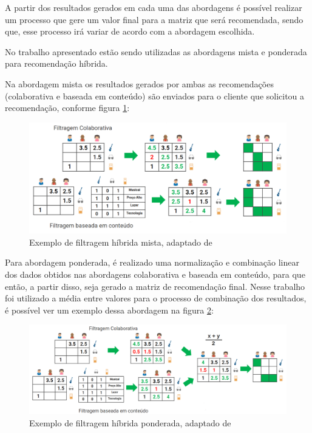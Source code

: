 A partir dos resultados gerados em cada uma das abordagens é possível realizar um processo que gere um valor final para a matriz que será recomendada, sendo que, esse processo irá variar de acordo com a abordagem escolhida. 

No trabalho apresentado estão sendo utilizadas as abordagens mista e ponderada para recomendação híbrida.

Na abordagem mista os resultados gerados por ambas as recomendações (colaborativa e baseada em conteúdo) são enviados para o cliente que solicitou a recomendação, conforme figura \ref{fig:algoritmohibridomisto}:

\begin{figure}[H]
	\centering
	\includegraphics[width=1\linewidth]{imagens/hibridamista.png}
	\caption[Exemplo de filtragem híbrida mista]{Exemplo de filtragem híbrida mista, adaptado de \cite{araujo2011apprecommender}}
    \label{fig:algoritmohibridomisto}
\end{figure}

Para abordagem ponderada, é realizado uma normalização e combinação linear dos dados obtidos nas abordagens colaborativa e baseada em conteúdo, para que então, a partir disso, seja gerado a matriz de recomendação final. Nesse trabalho foi utilizado a média entre valores para o processo de combinação dos resultados, é possível ver um exemplo dessa abordagem na figura \ref{fig:algoritmohibridoponderado}:

\begin{figure}[H]
	\centering
	\includegraphics[width=1\linewidth]{imagens/hibridaponderada.png}
	\caption[Exemplo de filtragem híbrida ponderada]{Exemplo de filtragem híbrida ponderada, adaptado de \cite{araujo2011apprecommender}}
    \label{fig:algoritmohibridoponderado}
\end{figure}